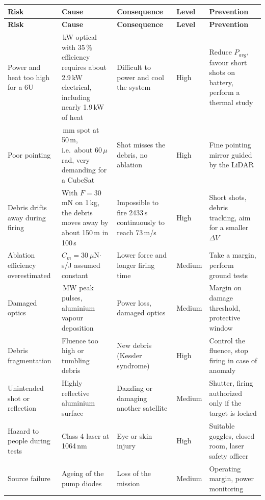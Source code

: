\documentclass[11pt,a4paper]{article}
\newcommand{\risqueentete}{%
  \toprule
  \textbf{Risk} & \textbf{Cause} & \textbf{Consequence} & \textbf{Level} & \textbf{Prevention} \\
  \midrule
  \endfirsthead
  \toprule
  \textbf{Risk} & \textbf{Cause} & \textbf{Consequence} & \textbf{Level} & \textbf{Prevention} \\
  \midrule
  \endhead
  \bottomrule
  \endfoot
}
\begin{document}
\begin{longtable}{>{\raggedright\arraybackslash}p{3.7cm} >{\raggedright\arraybackslash}p{4.2cm} >{\raggedright\arraybackslash}p{3.7cm} >{\centering\arraybackslash}p{1.4cm} >{\raggedright\arraybackslash}p{4.0cm}}
\risqueentete
Power and heat too high for a 6U & 1\,kW optical with 35\,\% efficiency requires about 2.9\,kW electrical, including nearly 1.9\,kW of heat & Difficult to power and cool the system & High & Reduce $P_{avg}$, favour short shots on battery, perform a thermal study \\
Poor pointing & 3\,mm spot at 50\,m, i.e.\ about 60\,$\mu$rad, very demanding for a CubeSat & Shot misses the debris, no ablation & High & Fine pointing mirror guided by the LiDAR \\
Debris drifts away during firing & With $F = 30$\,mN on 1\,kg, the debris moves away by about 150\,m in 100\,s & Impossible to fire 2433\,s continuously to reach 73\,m/s & High & Short shots, debris tracking, aim for a smaller $\Delta V$ \\
Ablation efficiency overestimated & $C_m = 30\ \mu$N$\cdot$s/J assumed constant & Lower force and longer firing time & Medium & Take a margin, perform ground tests \\
Damaged optics & 100\,MW peak pulses, aluminium vapour deposition & Power loss, damaged optics & Medium & Margin on damage threshold, protective window \\
Debris fragmentation & Fluence too high or tumbling debris & New debris (Kessler syndrome) & High & Control the fluence, stop firing in case of anomaly \\
Unintended shot or reflection & Highly reflective aluminium surface & Dazzling or damaging another satellite & Medium & Shutter, firing authorized only if the target is locked \\
Hazard to people during tests & Class 4 laser at 1064\,nm & Eye or skin injury & High & Suitable goggles, closed room, laser safety officer \\
Source failure & Ageing of the pump diodes & Loss of the mission & Medium & Operating margin, power monitoring \\
\end{longtable}
\end{document}
